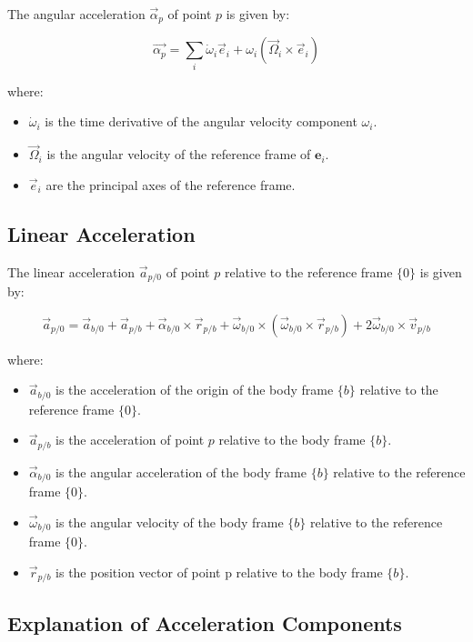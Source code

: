 The angular acceleration \( \vec{\alpha}_{p} \) of point \( p \) is given by:

\[
\vec{\alpha_{p}} = \sum_{i} \dot{\omega}_i \vec{e}_i + \omega_i (\vec{\Omega}_i \times \vec{e}_i)
\]

where:
\begin{itemize}
    \item \( \dot{\omega}_i \) is the time derivative of the angular velocity component \( \omega_i \).
    \item \( \vec{\Omega}_i \) is the angular velocity of the reference frame of \( \mathbf{e}_i \).
    \item \( \vec{e}_i \) are the principal axes of the reference frame.
\end{itemize}

\subsection{Linear Acceleration}

The linear acceleration \( \vec{a}_{p/0} \) of point \( p \) relative to the reference frame \( \{0\} \) is given by:

\[
\vec{a}_{p/0} = \vec{a}_{b/0} + \vec{a}_{p/b} + \vec{\alpha}_{b/0} \times \vec{r}_{p/b} + \vec{\omega}_{b/0} \times (\vec{\omega}_{b/0} \times \vec{r}_{p/b}) + 2 \vec{\omega}_{b/0} \times \vec{v}_{p/b}
\]

where:
\begin{itemize}
    \item \( \vec{a}_{b/0} \) is the acceleration of the origin of the body frame \( \{b\} \) relative to the reference frame \( \{0\} \).
    \item \( \vec{a}_{p/b} \) is the acceleration of point \( p \) relative to the body frame \( \{b\} \).
    \item \( \vec{\alpha}_{b/0} \) is the angular acceleration of the body frame \( \{b\} \) relative to the reference frame \( \{0\} \).
    \item \( \vec{\omega}_{b/0} \) is the angular velocity of the body frame \( \{b\} \) relative to the reference frame \( \{0\} \).
    \item \( \vec{r}_{p/b} \) is the position vector of point p relative to the body frame \( \{b\} \).
\end{itemize}

\subsection{Explanation of Acceleration Components}

